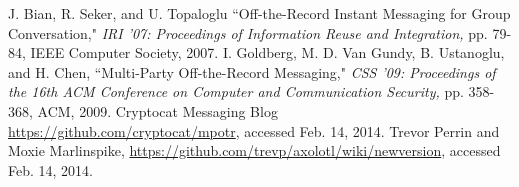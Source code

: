 \documentclass[%
preprint,
amsmath,amssymb,
aps,
prb,
floatfix,
]{revtex4-1}
\begin{document}
\begin{thebibliography}{99}
 J. Bian, R. Seker, and U. Topaloglu ``Off-the-Record Instant
Messaging for Group Conversation," \textit{IRI '07: Proceedings of Information
Reuse and Integration,} pp. 79-84, IEEE Computer Society, 2007.
 I. Goldberg, M. D. Van Gundy, B. Ustanoglu, and H. Chen,
``Multi-Party Off-the-Record Messaging," \textit{CSS '09: Proceedings of the
16th ACM Conference on Computer and Communication Security,} pp. 358-368, ACM,
2009.
 Cryptocat Messaging Blog
\url{https://github.com/cryptocat/mpotr}, accessed Feb. 14, 2014.
 Trevor Perrin and Moxie Marlinspike,
\url{https://github.com/trevp/axolotl/wiki/newversion}, accessed Feb. 14, 2014.
\end{thebibliography}
\end{document}
